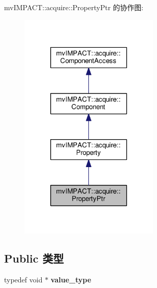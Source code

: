 mv\+I\+M\+P\+A\+C\+T\+:\+:acquire\+:\+:Property\+Ptr 的协作图\+:
\nopagebreak
\begin{figure}[H]
\begin{center}
\leavevmode
\includegraphics[width=190pt]{classmv_i_m_p_a_c_t_1_1acquire_1_1_property_ptr__coll__graph}
\end{center}
\end{figure}
\subsection*{Public 类型}
\begin{DoxyCompactItemize}
\item 
\hypertarget{classmv_i_m_p_a_c_t_1_1acquire_1_1_property_ptr_a0c7f0d7ec5de2dca3d9a4352ff227cec}{typedef void $\ast$ {\bfseries value\+\_\+type}}\label{classmv_i_m_p_a_c_t_1_1acquire_1_1_property_ptr_a0c7f0d7ec5de2dca3d9a4352ff227cec}

\end{DoxyCompactItemize}
